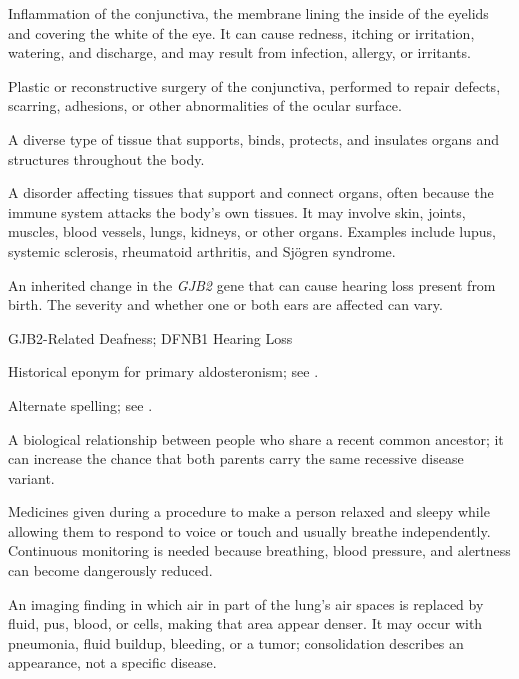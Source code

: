  Inflammation of the conjunctiva, the membrane lining the inside of the eyelids and covering the white of the eye. It can cause redness, itching or irritation, watering, and discharge, and may result from infection, allergy, or irritants.

 Plastic or reconstructive surgery of the conjunctiva, performed to repair defects,
scarring, adhesions, or other abnormalities of the ocular surface.

 A diverse type of tissue that supports, binds, protects, and insulates organs and
structures throughout the body.

 A disorder affecting tissues that support and connect organs, often because the immune system attacks the body’s own tissues. It may involve skin, joints, muscles, blood vessels, lungs, kidneys, or other organs. Examples include lupus, systemic sclerosis, rheumatoid arthritis, and Sjögren syndrome.

 An inherited change in the \textit{GJB2} gene that can cause hearing loss present from birth. The severity and whether one or both ears are affected can vary.

\synonyms
GJB2-Related Deafness; DFNB1 Hearing Loss

 Historical eponym for primary aldosteronism; see .

 Alternate spelling; see .

 A biological relationship between people who share a recent common ancestor; it can increase the chance that both parents carry the same recessive disease variant.

 Medicines given during a procedure to make a person relaxed and sleepy while allowing them to respond to voice or touch and usually breathe independently. Continuous monitoring is needed because breathing, blood pressure, and alertness can become dangerously reduced.

 An imaging finding in which air in part of the lung's air spaces is replaced by fluid, pus, blood, or cells, making that area appear denser. It may occur with pneumonia, fluid buildup, bleeding, or a tumor; consolidation describes an appearance, not a specific disease.

